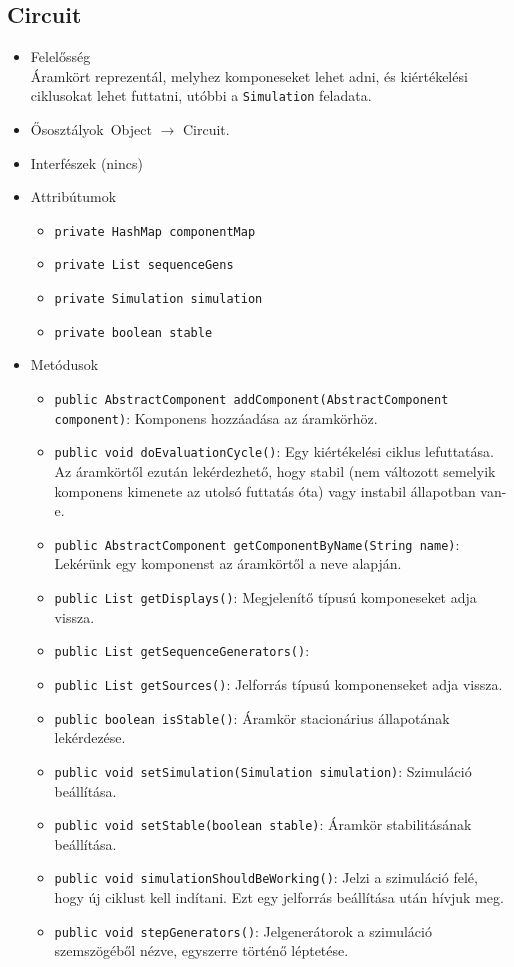 \subsection{Circuit}
\begin{itemize}
\item Felelősség\\
Áramkört reprezentál, melyhez komponeseket lehet adni, és kiértékelési ciklusokat  lehet futtatni, utóbbi a \texttt{Simulation} feladata.
\item Ősosztályok\ Object $\rightarrow{}$ Circuit.
\item Interfészek (nincs)
\item Attribútumok $\ $
\begin{itemize}
	\item \texttt{private HashMap componentMap} 
	\item \texttt{private List sequenceGens} 
	\item \texttt{private Simulation simulation} 
	\item \texttt{private boolean stable} 
\end{itemize}
\item Metódusok$\ $
\begin{itemize}
	\item \texttt{public AbstractComponent addComponent(AbstractComponent component)}: Komponens hozzáadása az áramkörhöz.
	\item \texttt{public void doEvaluationCycle()}: Egy kiértékelési ciklus lefuttatása. Az áramkörtől ezután lekérdezhető, hogy  stabil (nem változott semelyik komponens kimenete az utolsó futtatás óta)  vagy instabil állapotban van-e.
	\item \texttt{public AbstractComponent getComponentByName(String name)}: Lekérünk egy komponenst az áramkörtől a neve alapján.
	\item \texttt{public List getDisplays()}: Megjelenítő típusú komponeseket adja vissza.
	\item \texttt{public List getSequenceGenerators()}: 
	\item \texttt{public List getSources()}: Jelforrás típusú komponenseket adja vissza.
	\item \texttt{public boolean isStable()}: Áramkör stacionárius állapotának lekérdezése.
	\item \texttt{public void setSimulation(Simulation simulation)}: Szimuláció beállítása.
	\item \texttt{public void setStable(boolean stable)}: Áramkör stabilitásának beállítása.
	\item \texttt{public void simulationShouldBeWorking()}: Jelzi a szimuláció felé, hogy új ciklust kell indítani. Ezt egy jelforrás  beállítása után hívjuk meg.
	\item \texttt{public void stepGenerators()}: Jelgenerátorok a szimuláció szemszögéből nézve, egyszerre történő  léptetése.
\end{itemize}
\end{itemize}

